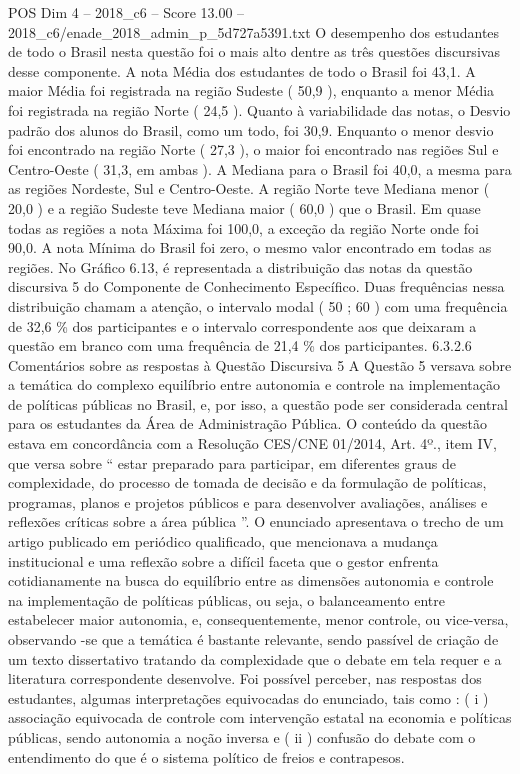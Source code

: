 \begin{textsample}{POS Dim 4 – 2018\_c6 – Score 13.00 – 2018\_c6/enade\_2018\_admin\_p\_5d727a5391.txt}
O desempenho dos estudantes de todo o Brasil nesta questão foi o mais alto dentre as três questões discursivas desse componente.
A nota Média dos estudantes de todo o Brasil foi 43,1.
A maior Média foi registrada na região Sudeste ( 50,9 ), enquanto a menor Média foi registrada na região Norte ( 24,5 ).
Quanto à variabilidade das notas, o Desvio padrão dos alunos do Brasil, como um todo, foi 30,9.
Enquanto o menor desvio foi encontrado na região Norte ( 27,3 ), o maior foi encontrado nas regiões Sul e Centro-Oeste ( 31,3, em ambas ).
A Mediana para o Brasil foi 40,0, a mesma para as regiões Nordeste, Sul e Centro-Oeste.
A região Norte teve Mediana menor ( 20,0 ) e a região Sudeste teve Mediana maior ( 60,0 ) que o Brasil.
Em quase todas as regiões a nota Máxima foi 100,0, a exceção da região Norte onde foi 90,0.
A nota Mínima do Brasil foi zero, o mesmo valor encontrado em todas as regiões.
No Gráfico 6.13, é representada a distribuição das notas da questão discursiva 5 do Componente de Conhecimento Específico.
Duas frequências nessa distribuição chamam a atenção, o intervalo modal ( 50 ; 60 ) com uma frequência de 32,6 \% dos participantes e o intervalo correspondente aos que deixaram a questão em branco com uma frequência de 21,4 \% dos participantes. 6.3.2.6 Comentários sobre as respostas à Questão Discursiva 5 A Questão 5 versava sobre a temática do complexo equilíbrio entre autonomia e controle na implementação de políticas públicas no Brasil, e, por isso, a questão pode ser considerada central para os estudantes da Área de Administração Pública.
O conteúdo da questão estava em concordância com a Resolução CES/CNE 01/2014, Art. 4º., item IV, que versa sobre “ estar preparado para participar, em diferentes graus de complexidade, do processo de tomada de decisão e da formulação de políticas, programas, planos e projetos públicos e para desenvolver avaliações, análises e reflexões críticas sobre a área pública ”.
O enunciado apresentava o trecho de um artigo publicado em periódico qualificado, que mencionava a mudança institucional e uma reflexão sobre a difícil faceta que o gestor enfrenta cotidianamente na busca do equilíbrio entre as dimensões autonomia e controle na implementação de políticas públicas, ou seja, o balanceamento entre estabelecer maior autonomia, e, consequentemente, menor controle, ou vice-versa, observando -se que a temática é bastante relevante, sendo passível de criação de um texto dissertativo tratando da complexidade que o debate em tela requer e a literatura correspondente desenvolve.
Foi possível perceber, nas respostas dos estudantes, algumas interpretações equivocadas do enunciado, tais como : ( i ) associação equivocada de controle com intervenção estatal na economia e políticas públicas, sendo autonomia a noção inversa e ( ii ) confusão do debate com o entendimento do que é o sistema político de freios e contrapesos.

\end{textsample}
